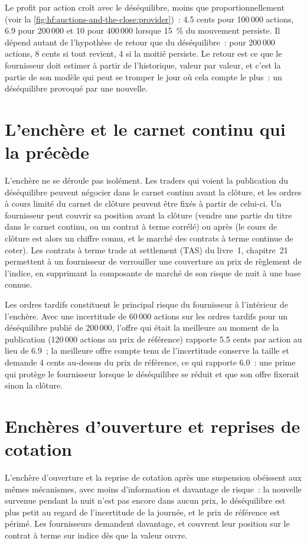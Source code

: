 Le profit par action croît avec le déséquilibre, moins que proportionnellement (voir la \cref{fig:hf:auctions-and-the-close:provider})~: 4.5 cents pour 100\,000 actions,
6.9 pour 200\,000 et 10 pour 400\,000 lorsque 15~\% du mouvement persiste. Il dépend autant de l'hypothèse de retour que du déséquilibre~: pour 200\,000 actions, 8
cents si tout revient, 4 si la moitié persiste. Le retour est ce que le fournisseur doit estimer à partir de l'historique, valeur par valeur, et c'est la partie de son
modèle qui peut se tromper le jour où cela compte le plus~: un déséquilibre provoqué par une nouvelle.

\section{L'enchère et le carnet continu qui la précède}

L'enchère ne se déroule pas isolément. Les traders qui voient la publication du déséquilibre peuvent négocier dans le carnet continu avant la clôture, et les
ordres à cours limité du carnet de clôture peuvent être fixés à partir de celui-ci. Un fournisseur peut couvrir sa position avant la clôture (vendre une partie du titre dans le carnet continu, ou un
contrat à terme corrélé) ou après (le cours de clôture est alors un chiffre connu, et le marché des contrats à terme continue de coter). Les contrats à terme trade at settlement (TAS) du livre~1,
chapitre~21 permettent à un fournisseur de verrouiller une couverture au prix de règlement de l'indice, en supprimant la composante de marché de son risque de nuit à une base connue.

Les ordres tardifs constituent le principal risque du fournisseur à l'intérieur de l'enchère. Avec une incertitude de 60\,000 actions sur les ordres tardifs pour un déséquilibre publié de 200\,000, l'offre
qui était la meilleure au moment de la publication (120\,000 actions au prix de référence) rapporte 5.5 cents par action au lieu de 6.9~; la meilleure offre compte tenu de
l'incertitude conserve la taille et demande 4 cents au-dessus du prix de référence, ce qui rapporte 6.0~: une prime qui protège le fournisseur lorsque le déséquilibre se réduit et
que son offre fixerait sinon la clôture.

\section{Enchères d'ouverture et reprises de cotation}

L'enchère d'ouverture et la reprise de cotation après une suspension obéissent aux mêmes mécanismes, avec moins d'information et davantage de risque~: la nouvelle survenue pendant la nuit n'est pas encore
dans aucun prix, le déséquilibre est plus petit au regard de l'incertitude de la journée, et le prix de référence est périmé. Les fournisseurs demandent davantage, et couvrent leur position sur le contrat à terme sur indice dès que la valeur ouvre.

